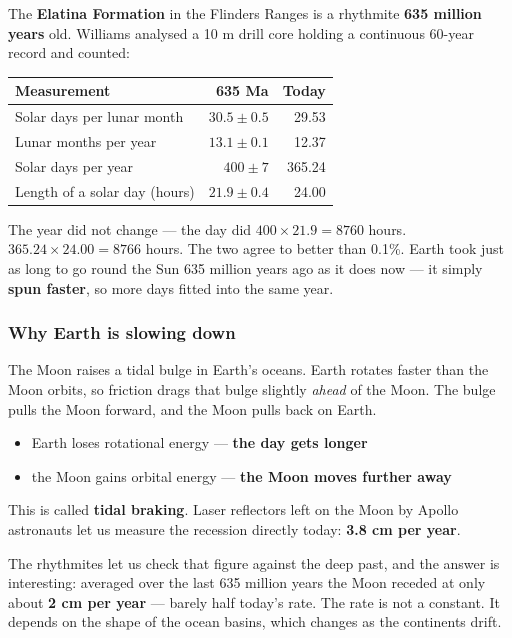 \documentclass[11pt,a4paper]{article}
\newcommand{\vocab}[1]{\textbf{\textcolor{Space}{#1}}}
\begin{document}
The \vocab{Elatina Formation} in the Flinders Ranges is a rhythmite
\textbf{635 million years} old. Williams analysed a 10 m drill core holding a
continuous 60-year record and counted:

\begin{center}
\begin{tabular}{lrr}
\toprule
\headingfont\textbf{Measurement} & \headingfont\textbf{635 Ma} & \headingfont\textbf{Today} \\
\midrule
Solar days per lunar month & $30.5 \pm 0.5$ & 29.53 \\
Lunar months per year      & $13.1 \pm 0.1$ & 12.37 \\
Solar days per year        & $400 \pm 7$    & 365.24 \\
Length of a solar day (hours) & $21.9 \pm 0.4$ & 24.00 \\
\bottomrule
\end{tabular}
\end{center}

\begin{infobox}{The year did not change --- the day did}
$400 \times 21.9 = 8760$ hours. $365.24 \times 24.00 = 8766$ hours. The two
agree to better than 0.1\%. Earth took just as long to go round the Sun 635
million years ago as it does now --- it simply \textbf{spun faster}, so more
days fitted into the same year.
\end{infobox}
\newpage
\subsubsection{Why Earth is slowing down}

The Moon raises a tidal bulge in Earth's oceans. Earth rotates faster than the
Moon orbits, so friction drags that bulge slightly \emph{ahead} of the Moon.
The bulge pulls the Moon forward, and the Moon pulls back on Earth.

\begin{itemize}
  \item Earth loses rotational energy --- \textbf{the day gets longer}
  \item the Moon gains orbital energy --- \textbf{the Moon moves further away}
\end{itemize}

This is called \vocab{tidal braking}. Laser reflectors left on the Moon by
Apollo astronauts let us measure the recession directly today:
\textbf{3.8 cm per year}.

The rhythmites let us check that figure against the deep past, and the answer
is interesting: averaged over the last 635 million years the Moon receded at
only about \textbf{2 cm per year} --- barely half today's rate. The rate is not
a constant. It depends on the shape of the ocean basins, which changes as the
continents drift.
\end{document}
